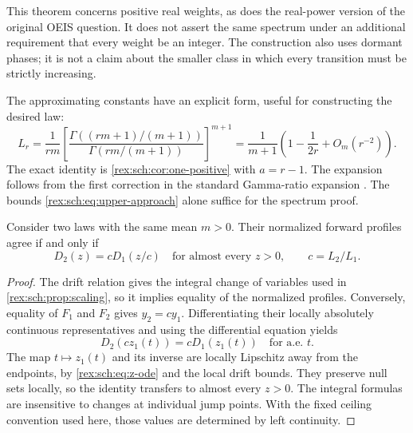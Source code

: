 This theorem concerns positive real weights, as does the real-power
version of the original OEIS question. It does not assert the same
spectrum under an additional requirement that every weight be an
integer. The construction also uses dormant phases; it is not a
claim about the smaller class in which every transition must be
strictly increasing.

The approximating constants have an explicit form, useful for
constructing the desired law:
\begin{equation}\label{rex:sch:eq:Lr-gamma}
 L_r=\frac1{rm}
 \left[
 \frac{\Gamma((rm+1)/(m+1))}
 {\Gamma(rm/(m+1))}
 \right]^{m+1}
 =\frac1{m+1}\left(1-\frac1{2r}+O_m(r^{-2})\right).
\end{equation}
The exact identity is \cref{rex:sch:cor:one-positive} with $a=r-1$.
The expansion follows from the first correction in the standard
Gamma-ratio expansion \cite[\S5.11(iii)]{dlmf}. The bounds
\eqref{rex:sch:eq:upper-approach} alone suffice for the spectrum proof.

\begin{proposition}
\label{rex:sch:prop:shape}
Consider two laws with the same mean $m>0$. Their normalized
forward profiles agree if and only if
\begin{equation}\label{rex:sch:eq:shape-classification}
 D_2(z)=cD_1(z/c)\quad\text{for almost every }z>0,
 \qquad c=L_2/L_1.
\end{equation}
\end{proposition}

\begin{proof}
The drift relation gives the integral change of variables used in
\cref{rex:sch:prop:scaling}, so it implies equality of the normalized
profiles. Conversely, equality of $F_1$ and $F_2$ gives
$y_2=cy_1$. Differentiating their locally absolutely continuous
representatives and using the differential equation yields
\[
 D_2(cz_1(t))=cD_1(z_1(t))\quad\text{for a.e. }t.
\]
The map $t\mapsto z_1(t)$ and its inverse are locally Lipschitz
away from the endpoints, by \eqref{rex:sch:eq:z-ode} and the local drift
bounds. They preserve null sets locally, so the identity transfers
to almost every $z>0$. The integral formulas are insensitive to changes
at individual jump points. With the fixed ceiling convention used here,
those values are determined by left continuity.
\end{proof}

